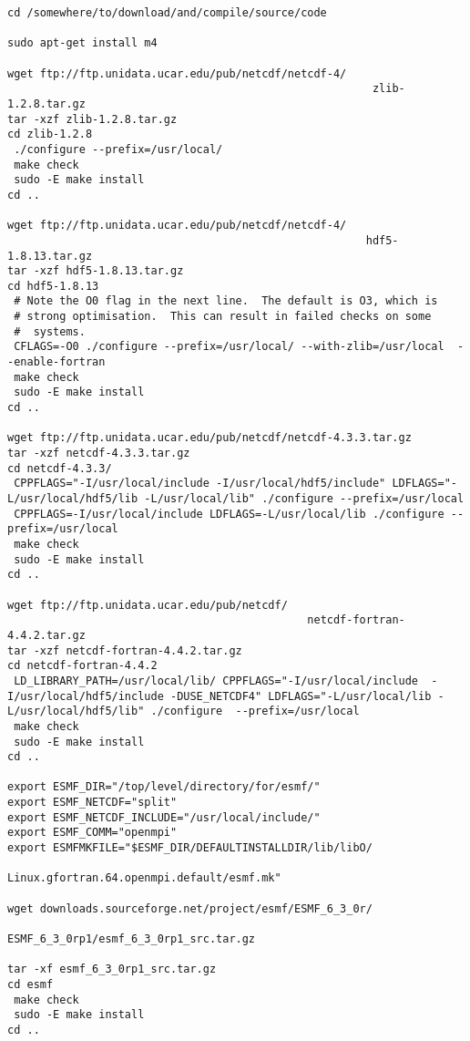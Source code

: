 \documentclass[12pt]{article}
\begin{document}
\begin{lstlisting}
cd /somewhere/to/download/and/compile/source/code

sudo apt-get install m4

wget ftp://ftp.unidata.ucar.edu/pub/netcdf/netcdf-4/
                                                        zlib-1.2.8.tar.gz
tar -xzf zlib-1.2.8.tar.gz 
cd zlib-1.2.8
 ./configure --prefix=/usr/local/
 make check
 sudo -E make install
cd ..

wget ftp://ftp.unidata.ucar.edu/pub/netcdf/netcdf-4/
                                                       hdf5-1.8.13.tar.gz	
tar -xzf hdf5-1.8.13.tar.gz 
cd hdf5-1.8.13
 # Note the O0 flag in the next line.  The default is O3, which is
 # strong optimisation.  This can result in failed checks on some
 #  systems.
 CFLAGS=-O0 ./configure --prefix=/usr/local/ --with-zlib=/usr/local  --enable-fortran 
 make check
 sudo -E make install
cd ..

wget ftp://ftp.unidata.ucar.edu/pub/netcdf/netcdf-4.3.3.tar.gz
tar -xzf netcdf-4.3.3.tar.gz 
cd netcdf-4.3.3/
 CPPFLAGS="-I/usr/local/include -I/usr/local/hdf5/include" LDFLAGS="-L/usr/local/hdf5/lib -L/usr/local/lib" ./configure --prefix=/usr/local 
 CPPFLAGS=-I/usr/local/include LDFLAGS=-L/usr/local/lib ./configure --prefix=/usr/local 
 make check
 sudo -E make install
cd ..

wget ftp://ftp.unidata.ucar.edu/pub/netcdf/
                                              netcdf-fortran-4.4.2.tar.gz
tar -xzf netcdf-fortran-4.4.2.tar.gz 
cd netcdf-fortran-4.4.2
 LD_LIBRARY_PATH=/usr/local/lib/ CPPFLAGS="-I/usr/local/include  -I/usr/local/hdf5/include -DUSE_NETCDF4" LDFLAGS="-L/usr/local/lib -L/usr/local/hdf5/lib" ./configure  --prefix=/usr/local
 make check
 sudo -E make install
cd ..

export ESMF_DIR="/top/level/directory/for/esmf/"
export ESMF_NETCDF="split"
export ESMF_NETCDF_INCLUDE="/usr/local/include/"
export ESMF_COMM="openmpi"
export ESMFMKFILE="$ESMF_DIR/DEFAULTINSTALLDIR/lib/libO/
                             Linux.gfortran.64.openmpi.default/esmf.mk"
                                                                                                              
wget downloads.sourceforge.net/project/esmf/ESMF_6_3_0r/
                                 ESMF_6_3_0rp1/esmf_6_3_0rp1_src.tar.gz
                                                                                                              
tar -xf esmf_6_3_0rp1_src.tar.gz
cd esmf 
 make check
 sudo -E make install
cd ..

\end{lstlisting}
\end{document}
